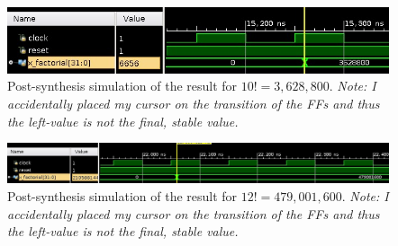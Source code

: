\documentclass[a4paper, 12pt]{article}
\begin{document}
\begin{landscape}
\begin{figure}[H]
\centering
\includegraphics[width=0.80\paperheight, keepaspectratio=true]{Sources/post-impl-10.jpg}
\caption{Post-synthesis simulation of the result for $10!=3,628,800$. \textit{Note: I accidentally placed my cursor on the transition of the FFs and thus the left-value is not the final, stable value.}}
\end{figure}


\begin{figure}[H]
\centering
\includegraphics[width=0.80\paperheight, keepaspectratio=true]{Sources/post-impl-12.jpg}
\caption{Post-synthesis simulation of the result for $12!=479,001,600$. \textit{Note: I accidentally placed my cursor on the transition of the FFs and thus the left-value is not the final, stable value.}}
\end{figure}

\end{landscape}
\end{document}
